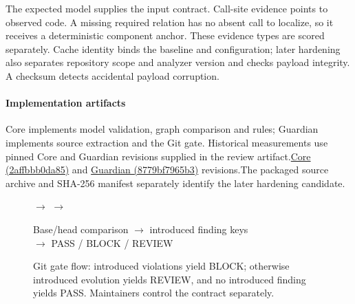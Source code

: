 The expected model supplies the input contract. Call-site evidence points to observed code. A missing required relation has no absent call to localize, so it receives a deterministic component anchor. These evidence types are scored separately. Cache identity binds the baseline and configuration; later hardening also separates repository scope and analyzer version and checks payload integrity. A checksum detects accidental payload corruption.

\paragraph{Implementation artifacts} Core implements model validation, graph comparison and rules; Guardian implements source extraction and the Git gate. Historical measurements use pinned \ifdefined\blindprofile Core and Guardian revisions supplied in the review artifact.\else\href{https://github.com/Little-Boy-s-ArchSync/archsync-core/tree/2affbbb0da859a32b9b9079b4bf718fc7b14993b}{Core (2affbbb0da85)} and \href{https://github.com/Little-Boy-s-ArchSync/archsync-guardian/tree/8779bf7965b3bd15f25834f17ca5321c85ae3f43}{Guardian (8779bf7965b3)} revisions.\fi\space The packaged source archive and SHA-256 manifest separately identify the later hardening candidate.

\begin{figure}[tb]
\centering
{}
$\rightarrow$
$\rightarrow$
\par\smallskip
\small Base/head comparison $\rightarrow$ introduced finding keys\\
$\rightarrow$ PASS / BLOCK / REVIEW
\caption{Git gate flow: introduced violations yield BLOCK; otherwise introduced evolution yields REVIEW, and no introduced finding yields PASS. Maintainers control the contract separately.}
\label{fig:workflow}
\end{figure}

